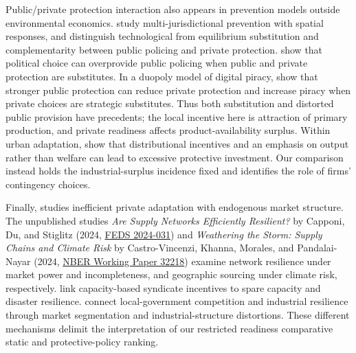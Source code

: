Public/private protection interaction also appears in prevention models outside environmental economics. \citet{LeePinto2009} study multi-jurisdictional prevention with spatial responses, and \citet{HickeyEtAl2021} distinguish technological from equilibrium substitution and complementarity between public policing and private protection. \citet{FrieheMungan2022} show that political choice can overprovide public policing when public and private protection are substitutes. In a duopoly model of digital piracy, \citet{ChoiBaeJun2010} show that stronger public protection can reduce private protection and increase piracy when private choices are strategic substitutes. Thus both substitution and distorted public provision have precedents; the local incentive here is attraction of primary production, and private readiness affects product-availability surplus. Within urban adaptation, \citet{HirteEtAl2018} show that distributional incentives and an emphasis on output rather than welfare can lead to excessive protective investment. Our comparison instead holds the industrial-surplus incidence fixed and identifies the role of firms' contingency choices.

Finally, \citet{Eisenack2014} studies inefficient private adaptation with endogenous market structure. The unpublished studies \emph{Are Supply Networks Efficiently Resilient?} by Capponi, Du, and Stiglitz (2024, \href{https://doi.org/10.17016/FEDS.2024.031}{FEDS 2024-031}) and \emph{Weathering the Storm: Supply Chains and Climate Risk} by Castro-Vincenzi, Khanna, Morales, and Pandalai-Nayar (2024, \href{https://doi.org/10.3386/w32218}{NBER Working Paper 32218}) examine network resilience under market power and incompleteness, and geographic sourcing under climate risk, respectively. \citet{GnutzmannEtAl2020} link capacity-based syndicate incentives to spare capacity and disaster resilience. \citet{MengDingWang2024} connect local-government competition and industrial resilience through market segmentation and industrial-structure distortions. These different mechanisms delimit the interpretation of our restricted readiness comparative static and protective-policy ranking.
